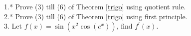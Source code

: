1.* Prove (3) till (6) of Theorem \ref{trigo} using quotient rule.\\
2.* Prove (3) till (6) of Theorem \ref{trigo} using first principle.\\
3. Let $f(x)=\sin(x^2\cos(e^x))$, find $f^\prime(x)$.